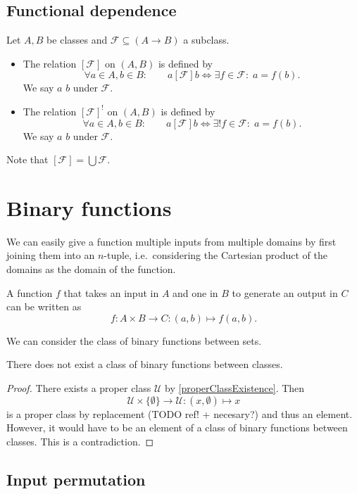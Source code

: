 \subsection{Functional dependence}
\begin{definition}
Let $A,B$ be classes and $\mathcal{F} \subseteq (A\to B)$ a subclass.
\begin{itemize}
\item The relation $[\mathcal{F}]$ on $(A,B)$ is defined by
\[ \forall a\in A, b\in B: \qquad a[\mathcal{F}]b \iff \exists f\in \mathcal{F}: \; a = f(b). \]
We say $a$  $b$ under $\mathcal{F}$.
\item The relation $[\mathcal{F}]^!$ on $(A,B)$ is defined by
\[ \forall a\in A, b\in B: \qquad a[\mathcal{F}]b \iff \exists! f\in \mathcal{F}: \; a = f(b). \]
We say $a$  $b$ under $\mathcal{F}$.
\end{itemize}
\end{definition}

Note that $[\mathcal{F}] = \bigcup\mathcal{F}$.

\section{Binary functions}
We can easily give a function multiple inputs from multiple domains by first joining them into an $n$-tuple, i.e.\ considering the Cartesian product of the domains as the domain of the function.

\begin{example}
A function $f$ that takes an input in $A$ and one in $B$ to generate an output in $C$ can be written as
\[ f: A\times B \to C: (a,b)\mapsto f(a,b). \]
\end{example}

We can consider the class of binary functions between sets.
\begin{lemma}
There does not exist a class of binary functions between classes.
\end{lemma}
\begin{proof}
There exists a proper class $\mathcal{U}$ by \ref{properClassExistence}. Then
\[ \mathcal{U}\times \{\emptyset\}\to \mathcal{U}: (x,\emptyset) \mapsto x \]
is a proper class by replacement (TODO ref! + necesary?) and thus an element. However, it would have to be an element of a class of binary functions between classes. This is a contradiction.
\end{proof}

\subsection{Input permutation}

